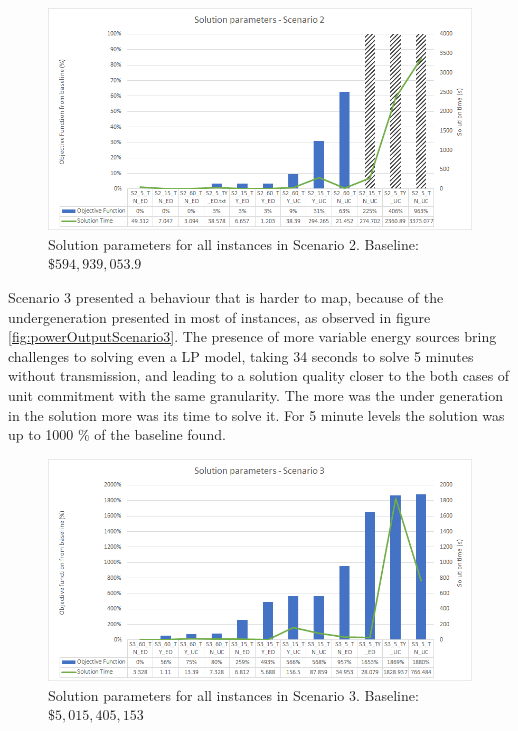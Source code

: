 \documentclass[12pt,LUDisStyle,twosided]{book}
\begin{document}
\begin{figure}[h] 
  \centering
  
	  \includegraphics[width=\textwidth,height=\textheight,keepaspectratio]{SolutionParametersS2.png}
  
  \caption{Solution parameters for all instances in Scenario 2. Baseline: $\$594,939,053.9$}
  \label{fig:solutionparameterss2}
\end{figure}

Scenario 3 presented a behaviour that is harder to map, because of the undergeneration presented in most of instances, as observed in figure \ref{fig:powerOutputScenario3}. The presence of more variable energy sources bring challenges to solving even a LP model, taking 34 seconds to solve 5 minutes without transmission, and leading to a solution quality closer to the both cases of unit commitment with the same granularity. The more was the under generation in the solution more was its time to solve it. For 5 minute levels the solution was up to 1000 \% of the baseline found.

\begin{figure}[h] 
  \centering
  
	  \includegraphics[width=\textwidth,height=\textheight,keepaspectratio]{SolutionParametersS3.png}
  
  \caption{Solution parameters for all instances in Scenario 3. Baseline: $\$5,015,405,153$}
  \label{fig:solutionparameterss3}
\end{figure}
\end{document}
